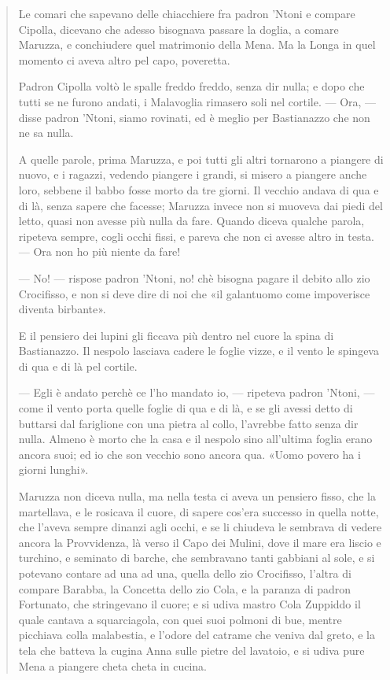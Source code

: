 \documentclass{book}
\newcounter{mar}
\newcommand{\mar}[2]{
\addtocounter{mar}{1}
\hspace{-0.73em}\textsuperscript{\hyperref[\thechapter.\themar]{\themar}}\marginpar{\footnotesize\textbf{\themar}\label{\thechapter.\themar}. #2}\hspace{-0.4em}
}
\newcommand{\mat}[1]{\mar{gg}{#1}}
\begin{document}
\begin{quote}
Le comari che sapevano delle chiacchiere fra padron ’Ntoni e compare Cipolla, dicevano che adesso bisognava passare la doglia, a comare Maruzza, e conchiudere quel matrimonio della Mena. Ma la Longa in quel momento ci aveva altro pel capo, poveretta.

Padron Cipolla voltò le spalle freddo freddo, senza dir nulla; e dopo che tutti se ne furono andati, i Malavoglia rimasero soli nel cortile. — Ora, — disse padron ’Ntoni, siamo rovinati, ed è meglio per Bastianazzo che non ne sa nulla.

A quelle parole, prima Maruzza, e poi tutti gli altri tornarono a piangere di nuovo, e i ragazzi, vedendo piangere i grandi, si misero a piangere anche loro, sebbene il babbo fosse morto da tre giorni. Il vecchio andava di qua e di là, senza sapere che facesse; Maruzza invece non si muoveva dai piedi del letto, quasi non avesse più nulla da fare. Quando diceva qualche parola, ripeteva sempre, cogli occhi fissi, e pareva che non ci avesse altro in testa. — Ora non ho più niente da fare!

— No! — rispose padron ’Ntoni, no! chè bisogna pagare il debito allo zio Crocifisso, e non si deve dire di noi che «il galantuomo come impoverisce diventa birbante».\mat{codice comportamentale moralmente giusto di
  Padron 'Ntoni}

E il pensiero dei lupini gli ficcava più dentro nel cuore la spina di Bastianazzo. Il nespolo lasciava cadere le foglie vizze, e il vento le spingeva di qua e di là pel cortile.

— Egli è andato perchè ce l’ho mandato io, — ripeteva padron ’Ntoni, — come il vento porta quelle foglie di qua e di là, e se gli avessi detto di buttarsi dal fariglione con una pietra al collo, l’avrebbe fatto senza dir nulla. Almeno è morto che la casa e il nespolo sino all’ultima foglia erano ancora suoi; ed io che son vecchio sono ancora qua. «Uomo povero ha i giorni lunghi».

Maruzza non diceva nulla, ma nella testa ci aveva un pensiero fisso, che la martellava, e le rosicava il cuore, di sapere cos’era successo in quella notte, che l’aveva sempre dinanzi agli occhi, e se li chiudeva le sembrava di vedere ancora la Provvidenza, là verso il Capo dei Mulini, dove il mare era liscio e turchino, e seminato di barche, che sembravano tanti gabbiani al sole, e si potevano contare ad una ad una, quella dello zio Crocifisso, l’altra di compare Barabba, la Concetta dello zio Cola, e la paranza di padron Fortunato, che stringevano il cuore; e si udiva mastro Cola Zuppiddo il quale cantava a squarciagola, con quei suoi polmoni di bue, mentre picchiava colla malabestia, e l’odore del catrame che veniva dal greto, e la tela che batteva la cugina Anna sulle pietre del lavatoio, e si udiva pure Mena a piangere cheta cheta in cucina.


\end{quote}
\end{document}
